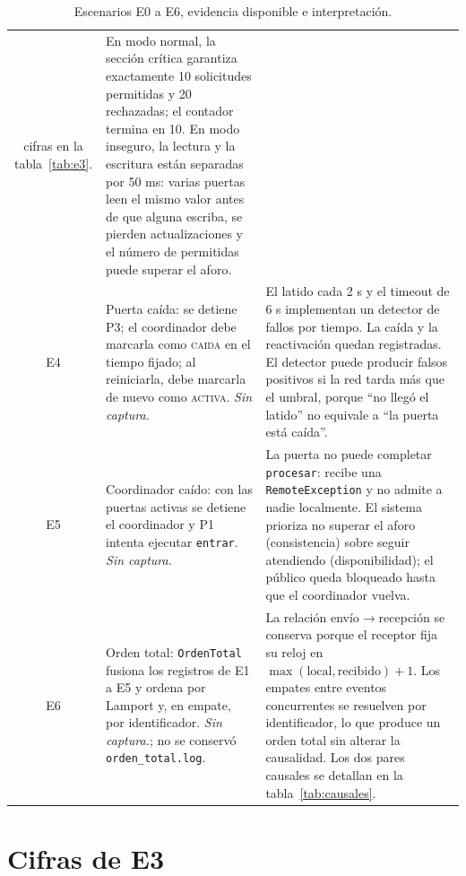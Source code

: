 \documentclass[10pt]{article}
\newcommand{\sincaptura}{\textit{Sin captura.}}
\newcommand{\cod}[1]{\texttt{#1}}
\begin{document}
\begin{table}[H]
\begin{tabularx}{\textwidth}{@{}c >{\raggedright\arraybackslash}p{3.35cm} X@{}}
cifras en la tabla~\ref{tab:e3}. &
En modo normal, la sección crítica garantiza exactamente 10 solicitudes
permitidas y 20 rechazadas; el contador termina en 10. En modo inseguro, la
lectura y la escritura están separadas por 50 ms: varias puertas leen el mismo
valor antes de que alguna escriba, se pierden actualizaciones y el número de
permitidas puede superar el aforo. \\
\addlinespace
E4 &
Puerta caída: se detiene P3; el coordinador debe marcarla como \textsc{caida}
en el tiempo fijado; al reiniciarla, debe marcarla de nuevo como
\textsc{activa}. \sincaptura &
El latido cada 2 s y el timeout de 6 s implementan un detector de fallos por
tiempo. La caída y la reactivación quedan registradas. El detector puede
producir falsos positivos si la red tarda más que el umbral, porque ``no llegó
el latido'' no equivale a ``la puerta está caída''. \\
\addlinespace
E5 &
Coordinador caído: con las puertas activas se detiene el coordinador y P1
intenta ejecutar \cod{entrar}. \sincaptura &
La puerta no puede completar \cod{procesar}: recibe una \cod{RemoteException}
y no admite a nadie localmente. El sistema prioriza no superar el aforo
(consistencia) sobre seguir atendiendo (disponibilidad); el público queda
bloqueado hasta que el coordinador vuelva. \\
\addlinespace
E6 &
Orden total: \cod{OrdenTotal} fusiona los registros de E1 a E5 y ordena por
Lamport y, en empate, por identificador. \sincaptura; no se conservó
\cod{orden\_total.log}. &
La relación envío$\to$recepción se conserva porque el receptor fija su reloj
en $\max(\text{local},\text{recibido})+1$. Los empates entre eventos
concurrentes se resuelven por identificador, lo que produce un orden total sin
alterar la causalidad. Los dos pares causales se detallan en la
tabla~\ref{tab:causales}. \\
\bottomrule
\end{tabularx}
\caption{Escenarios E0 a E6, evidencia disponible e interpretación.}
\label{tab:escenarios}
\end{table}

\section{Cifras de E3}
\end{document}

